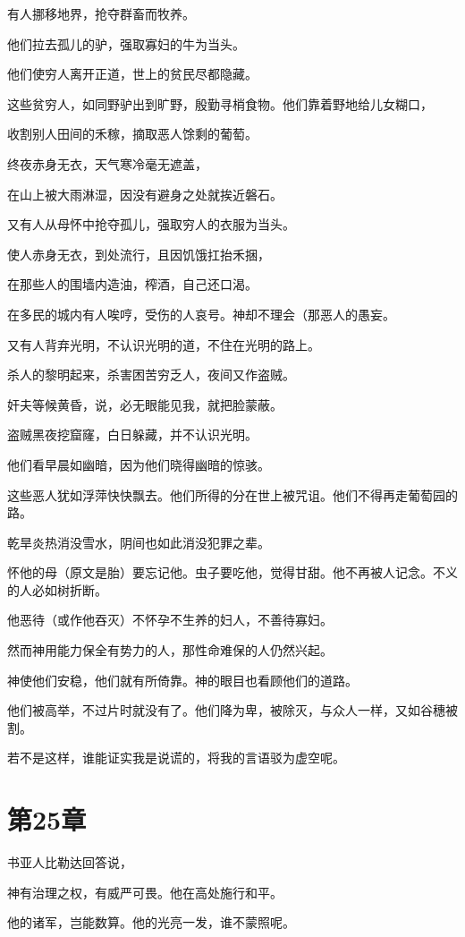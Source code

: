 \documentclass[12pt,oneside]{book}
\begin{document}
有人挪移地界，抢夺群畜而牧养。

他们拉去孤儿的驴，强取寡妇的牛为当头。

他们使穷人离开正道，世上的贫民尽都隐藏。

这些贫穷人，如同野驴出到旷野，殷勤寻梢食物。他们靠着野地给儿女糊口，

收割别人田间的禾稼，摘取恶人馀剩的葡萄。

终夜赤身无衣，天气寒冷毫无遮盖，

在山上被大雨淋湿，因没有避身之处就挨近磐石。

又有人从母怀中抢夺孤儿，强取穷人的衣服为当头。

使人赤身无衣，到处流行，且因饥饿扛抬禾捆，

在那些人的围墙内造油，榨酒，自己还口渴。

在多民的城内有人唉哼，受伤的人哀号。神却不理会（那恶人的愚妄。

又有人背弃光明，不认识光明的道，不住在光明的路上。

杀人的黎明起来，杀害困苦穷乏人，夜间又作盗贼。

奸夫等候黄昏，说，必无眼能见我，就把脸蒙蔽。

盗贼黑夜挖窟窿，白日躲藏，并不认识光明。

他们看早晨如幽暗，因为他们晓得幽暗的惊骇。

这些恶人犹如浮萍快快飘去。他们所得的分在世上被咒诅。他们不得再走葡萄园的路。

乾旱炎热消没雪水，阴间也如此消没犯罪之辈。

怀他的母（原文是胎）要忘记他。虫子要吃他，觉得甘甜。他不再被人记念。不义的人必如树折断。

他恶待（或作他吞灭）不怀孕不生养的妇人，不善待寡妇。

然而神用能力保全有势力的人，那性命难保的人仍然兴起。

神使他们安稳，他们就有所倚靠。神的眼目也看顾他们的道路。

他们被高举，不过片时就没有了。他们降为卑，被除灭，与众人一样，又如谷穗被割。

若不是这样，谁能证实我是说谎的，将我的言语驳为虚空呢。


\chapter{第25章}
书亚人比勒达回答说，

神有治理之权，有威严可畏。他在高处施行和平。

他的诸军，岂能数算。他的光亮一发，谁不蒙照呢。
\end{document}

